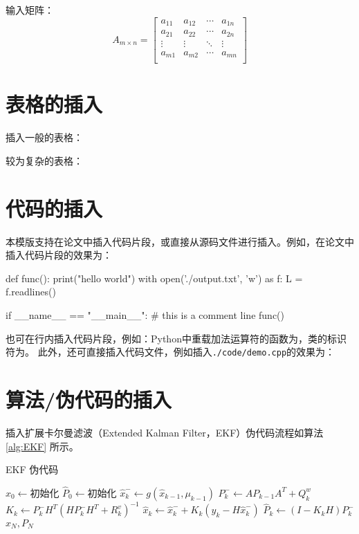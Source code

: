输入矩阵：
\begin{equation}
	\label{eqn:matrix}
	A_{m\times n}=
	\left[ {\begin{array}{cccc}
			a_{11} & a_{12} & \cdots & a_{1n}\\
			a_{21} & a_{22} & \cdots & a_{2n}\\
			\vdots & \vdots & \ddots & \vdots\\
			a_{m1} & a_{m2} & \cdots & a_{mn}\\
	\end{array}}\right]
\end{equation}

\section{表格的插入}
\label{sec:table}
插入一般的表格：


较为复杂的表格：


\section{代码的插入}
\label{sec:code}
本模版支持在论文中插入代码片段，或直接从源码文件进行插入。例如，在论文中插入代码片段的效果为：
\begin{python}
def func():
print("hello world")
with open('./output.txt', 'w') as f:
L = f.readlines()
	
if __name__ == "__main__":
# this is a comment line
func()
\end{python}
也可在行内插入代码片段，例如：Python中重载加法运算符的函数为，类的标识符为。
此外，还可直接插入代码文件，例如插入\texttt{./code/demo.cpp}的效果为：


\section{算法/伪代码的插入}
插入扩展卡尔曼滤波（Extended Kalman Filter，EKF）伪代码流程如算法 \ref{alg:EKF} 所示。
\begin{algorithm}[H]
    \caption{EKF 伪代码}
    \label{alg:EKF}
    \begin{algorithmic}[htbp]
        \Statex
        \State $\hat{x}_{0} \gets \text{初始化}$
        \State $\hat{P}_{0} \gets \text{初始化}$
        \State $ \hat{x}_{k}^{-} \gets g(\hat{x}_{k-1},\mu _{k-1})$
        \State $ P_{k}^{-} \gets A P_{k-1} A^T + Q^w_k $
        \State $ K_k \gets P_{k}^{-} H^T ( H P_{k}^{-} H^T + R^v_k )^{-1} $
        \State $ \hat{x}_k \gets \hat{x}_{k}^{-} + K_k\left( y_k - H \hat{x}_{k}^{-} \right) $
        \State $ \hat{P}_k \gets \left( I - K_k H \right) P_{k}^{-} $
        \EndFor
        \State \Return $ \hat{x}_N, P_N $
        \EndFunction
    \end{algorithmic}
\end{algorithm}